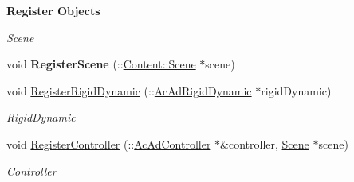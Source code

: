 \begin{Indent}{\bf Register Objects}\par
{\em \label{_amgrp6a304d42496b952c380b92415f075c10}
 Scene }\begin{DoxyCompactItemize}
\item 
\hypertarget{classContent_1_1Physics_1_1PhysicsPhysX_a8558023e07895ed18595a2a69c5a8f89}{
void {\bfseries RegisterScene} (::\hyperlink{classContent_1_1Scene}{Content::Scene} $\ast$scene)}
\label{classContent_1_1Physics_1_1PhysicsPhysX_a8558023e07895ed18595a2a69c5a8f89}

\item 
\hypertarget{classContent_1_1Physics_1_1PhysicsPhysX_af91de4da1562ea746e4757d21525e0be}{
void \hyperlink{classContent_1_1Physics_1_1PhysicsPhysX_af91de4da1562ea746e4757d21525e0be}{RegisterRigidDynamic} (::\hyperlink{classContent_1_1Actor_1_1Admin_1_1RigidDynamic}{AcAdRigidDynamic} $\ast$rigidDynamic)}
\label{classContent_1_1Physics_1_1PhysicsPhysX_af91de4da1562ea746e4757d21525e0be}

\begin{DoxyCompactList}\small\item\em RigidDynamic \item\end{DoxyCompactList}\item 
\hypertarget{classContent_1_1Physics_1_1PhysicsPhysX_a900025d8a3f8ccd18fe37cb2c4513458}{
void \hyperlink{classContent_1_1Physics_1_1PhysicsPhysX_a900025d8a3f8ccd18fe37cb2c4513458}{RegisterController} (::\hyperlink{classContent_1_1Actor_1_1Admin_1_1Controller}{AcAdController} $\ast$\&controller, \hyperlink{classContent_1_1Scene}{Scene} $\ast$scene)}
\label{classContent_1_1Physics_1_1PhysicsPhysX_a900025d8a3f8ccd18fe37cb2c4513458}

\begin{DoxyCompactList}\small\item\em Controller \item\end{DoxyCompactList}\end{DoxyCompactItemize}
\end{Indent}

